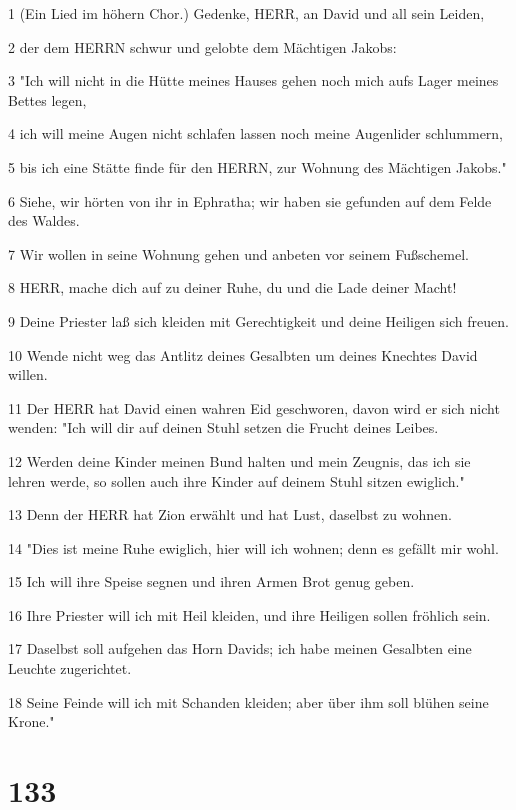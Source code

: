 \par 1 (Ein Lied im höhern Chor.) Gedenke, HERR, an David und all sein Leiden,
\par 2 der dem HERRN schwur und gelobte dem Mächtigen Jakobs:
\par 3 "Ich will nicht in die Hütte meines Hauses gehen noch mich aufs Lager meines Bettes legen,
\par 4 ich will meine Augen nicht schlafen lassen noch meine Augenlider schlummern,
\par 5 bis ich eine Stätte finde für den HERRN, zur Wohnung des Mächtigen Jakobs."
\par 6 Siehe, wir hörten von ihr in Ephratha; wir haben sie gefunden auf dem Felde des Waldes.
\par 7 Wir wollen in seine Wohnung gehen und anbeten vor seinem Fußschemel.
\par 8 HERR, mache dich auf zu deiner Ruhe, du und die Lade deiner Macht!
\par 9 Deine Priester laß sich kleiden mit Gerechtigkeit und deine Heiligen sich freuen.
\par 10 Wende nicht weg das Antlitz deines Gesalbten um deines Knechtes David willen.
\par 11 Der HERR hat David einen wahren Eid geschworen, davon wird er sich nicht wenden: "Ich will dir auf deinen Stuhl setzen die Frucht deines Leibes.
\par 12 Werden deine Kinder meinen Bund halten und mein Zeugnis, das ich sie lehren werde, so sollen auch ihre Kinder auf deinem Stuhl sitzen ewiglich."
\par 13 Denn der HERR hat Zion erwählt und hat Lust, daselbst zu wohnen.
\par 14 "Dies ist meine Ruhe ewiglich, hier will ich wohnen; denn es gefällt mir wohl.
\par 15 Ich will ihre Speise segnen und ihren Armen Brot genug geben.
\par 16 Ihre Priester will ich mit Heil kleiden, und ihre Heiligen sollen fröhlich sein.
\par 17 Daselbst soll aufgehen das Horn Davids; ich habe meinen Gesalbten eine Leuchte zugerichtet.
\par 18 Seine Feinde will ich mit Schanden kleiden; aber über ihm soll blühen seine Krone."

\chapter{133}

